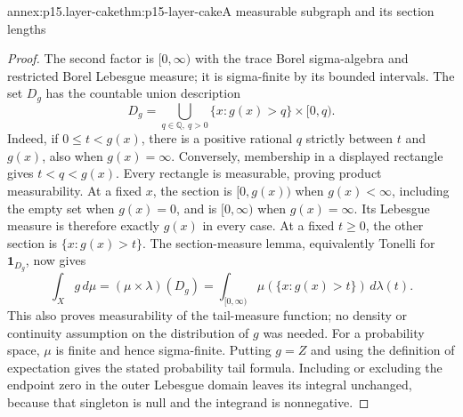\begin{annexitem}{annex:p15.layer-cake}{thm:p15-layer-cake}{A measurable subgraph and its section lengths}
\begin{proof}
The second factor is \([0,\infty)\) with the trace Borel
sigma-algebra and restricted Borel Lebesgue measure; it is sigma-finite
by its bounded intervals. The set \(D_g\) has the countable union
description
\[
 D_g=\bigcup_{q\in\mathbb Q,\ q>0}
            \{x:g(x)>q\}\times[0,q).
\]
Indeed, if \(0\leq t<g(x)\), there is a positive rational
\(q\) strictly between \(t\) and \(g(x)\), also when
\(g(x)=\infty\). Conversely, membership in a displayed rectangle
gives \(t<q<g(x)\). Every rectangle is measurable, proving
product measurability. At a fixed \(x\), the section is
\([0,g(x))\) when \(g(x)<\infty\), including the empty set when
\(g(x)=0\), and is \([0,\infty)\) when \(g(x)=\infty\).
Its Lebesgue measure is therefore exactly \(g(x)\) in every case.
At a fixed \(t\geq0\), the other section is \(\{x:g(x)>t\}\).
The section-measure lemma, equivalently Tonelli for \(\mathbf1_{D_g}\),
now gives
\[
 \int_Xg\,d\mu
   =(\mu\times\lambda)(D_g)
   =\int_{[0,\infty)}\mu(\{x:g(x)>t\})\,d\lambda(t).
\]
This also proves measurability of the tail-measure function; no density
or continuity assumption on the distribution of \(g\) was needed.
For a probability space, \(\mu\) is finite and hence sigma-finite.
Putting \(g=Z\) and using the definition of expectation gives the
stated probability tail formula. Including or excluding the endpoint
zero in the outer Lebesgue domain leaves its integral unchanged,
because that singleton is null and the integrand is nonnegative.
\end{proof}
\end{annexitem}
